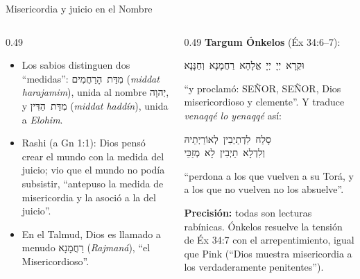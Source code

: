 \documentclass[hyperref={bookmarks=false},aspectratio=169]{beamer}
\newcommand{\heb}[1]{\mbox{\foreignlanguage{hebrew}{#1}}}
\newcommand{\SENOR}{S{\fontsize{0.78em}{1em}\selectfont EÑOR}}
\newcommand{\precision}[1]{{\footnotesize\color{gris}\textbf{Precisión:} #1}}
\begin{document}
\begin{frame}{Misericordia y juicio en el Nombre}
\begin{columns}[t,onlytextwidth]
\begin{column}{0.49\textwidth}\small
\begin{itemize}
\item Los sabios distinguen dos ``medidas'': \heb{מִדַּת הָרַחֲמִים} (\emph{middat harajamim}), unida al nombre \heb{יְהוָה}, y \heb{מִדַּת הַדִּין} (\emph{middat haddín}), unida a \emph{Elohim}.
\item Rashi (a Gn 1:1): Dios pensó crear el mundo con la medida del juicio; vio que el mundo no podía subsistir, ``antepuso la medida de misericordia y la asoció a la del juicio''.
\item En el Talmud, Dios es llamado a menudo \heb{רַחֲמָנָא} (\emph{Rajmaná}), ``el Misericordioso''.
\end{itemize}
\end{column}
\begin{column}{0.49\textwidth}
\scriptsize\textbf{Targum Ónkelos} (Éx 34:6--7):
\begin{center}\heb{וּקְרָא יְיָ יְיָ אֱלָהָא רַחֲמָנָא וְחַנָּנָא}\end{center}
``y proclamó: \SENOR, \SENOR, Dios misericordioso y clemente''. Y traduce \emph{venaqqé lo yenaqqé} así:
\begin{center}\heb{סָלַח לִדְתַיְבִין לְאוֹרַיְתֵיהּ}\\ \heb{וְלִדְלָא תַיְבִין לָא מְזַכֵּי}\end{center}
``perdona a los que vuelven a su Torá, y a los que no vuelven no los absuelve''.\par\smallskip
\precision{todas son lecturas rabínicas. Ónkelos resuelve la tensión de Éx 34:7 con el arrepentimiento, igual que Pink (``Dios muestra misericordia a los verdaderamente penitentes'').}
\end{column}
\end{columns}
\end{frame}
\end{document}
